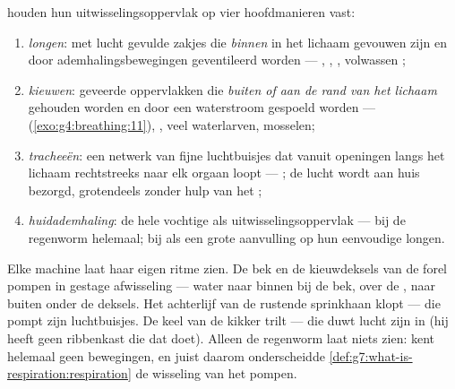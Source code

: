 \begin{definition}\label{def:g7:how-animals-breathe:four}
 houden hun uitwisselingsoppervlak op vier hoofdmanieren vast:
\begin{enumerate}
  \item \emph{longen}: met lucht gevulde zakjes die
        \emph{binnen} in het lichaam gevouwen zijn en door
        ademhalingsbewegingen geventileerd worden --- , ,
        , volwassen ;
  \item \emph{kieuwen}: geveerde oppervlakken die
        \emph{buiten of aan de rand van het lichaam} gehouden worden en
        door een waterstroom gespoeld worden --- 
        (\cref{exo:g4:breathing:11}), , veel waterlarven,
        mosselen;
  \item \emph{tracheeën}: een netwerk van fijne
        luchtbuisjes dat vanuit openingen langs het lichaam rechtstreeks
        naar elk orgaan loopt --- ; de lucht wordt aan huis
        bezorgd, grotendeels zonder hulp van het ;
  \item \emph{huidademhaling}: de hele vochtige
         als uitwisselingsoppervlak --- bij de regenworm helemaal;
        bij  als een grote aanvulling op hun eenvoudige longen.
\end{enumerate}
\end{definition}

\begin{example}\label{ex:g7:how-animals-breathe:watch}
Elke machine laat haar eigen ritme zien. De bek en de kieuwdeksels van de
forel pompen in gestage afwisseling --- water naar binnen bij de bek, over
de , naar buiten onder de deksels. Het achterlijf van de rustende
sprinkhaan klopt --- die pompt zijn luchtbuisjes. De keel van de kikker
trilt --- die duwt lucht zijn  in (hij heeft geen ribbenkast die dat
doet). Alleen de regenworm laat niets zien:  kent helemaal
geen bewegingen, en juist daarom onderscheidde
\cref{def:g7:what-is-respiration:respiration} de wisseling van het pompen.
\end{example}

